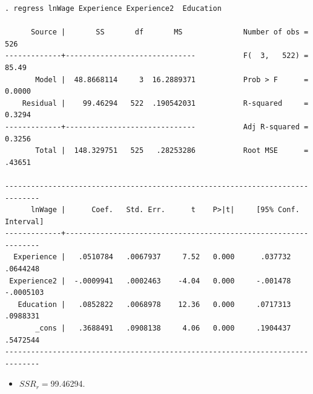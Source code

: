 \documentclass[notes=show,compress,beamer]{beamer}
\begin{document}
\begin{frame}[fragile=singleslide,shrink=30]%

\begin{verbatim}
. regress lnWage Experience Experience2  Education
 
      Source |       SS       df       MS              Number of obs =     526
-------------+------------------------------           F(  3,   522) =   85.49
       Model |  48.8668114     3  16.2889371           Prob > F      =  0.0000
    Residual |    99.46294   522  .190542031           R-squared     =  0.3294
-------------+------------------------------           Adj R-squared =  0.3256
       Total |  148.329751   525   .28253286           Root MSE      =  .43651
 
------------------------------------------------------------------------------
      lnWage |      Coef.   Std. Err.      t    P>|t|     [95% Conf. Interval]
-------------+----------------------------------------------------------------
  Experience |   .0510784   .0067937     7.52   0.000      .037732    .0644248
 Experience2 |  -.0009941   .0002463    -4.04   0.000     -.001478   -.0005103
   Education |   .0852822   .0068978    12.36   0.000     .0717313    .0988331
       _cons |   .3688491   .0908138     4.06   0.000     .1904437    .5472544
------------------------------------------------------------------------------
\end{verbatim}

\begin{itemize}
\item $SSR_{r}=$99.46294.
\end{itemize}

\end{frame}%
\end{document}
